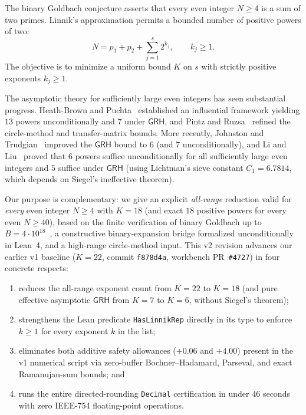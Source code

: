 \documentclass[11pt,a4paper]{article}
\newcommand{\GRH}{\mathsf{GRH}}
\begin{document}
The binary Goldbach conjecture asserts that every even integer $N \ge 4$ is a sum of two primes. Linnik's approximation permits a bounded number of positive powers of two:
\[
  N = p_1 + p_2 + \sum_{j=1}^{s} 2^{k_j}, \qquad k_j \ge 1.
\]
The objective is to minimize a uniform bound $K$ on $s$ with strictly positive exponents $k_j \ge 1$.

The asymptotic theory for sufficiently large even integers has seen substantial progress. Heath-Brown and Puchta~\cite{HBP2002} established an influential framework yielding $13$ powers unconditionally and $7$ under $\GRH$, and Pintz and Ruzsa~\cite{PR2003,PR2020} refined the circle-method and transfer-matrix bounds. More recently, Johnston and Trudgian~\cite{JT2026} improved the $\GRH$ bound to $6$ (and $7$ unconditionally), and Li and Liu~\cite{LL2026} proved that $6$ powers suffice unconditionally for all sufficiently large even integers and $5$ suffice under $\GRH$ (using Lichtman's sieve constant $C_1 = 6.7814$, which depends on Siegel's ineffective theorem).

Our purpose is complementary: we give an explicit \emph{all-range} reduction valid for \emph{every} even integer $N \ge 4$ with $K = 18$ (and exact $18$ positive powers for every even $N \ge 40$), based on the finite verification of binary Goldbach up to $B = 4\cdot 10^{18}$~\cite{OSHP2014}, a constructive binary-expansion bridge formalized unconditionally in Lean~4, and a high-range circle-method input. This v2 revision advances our earlier v1 baseline ($K = 22$, commit \texttt{f878d4a}, workbench PR~\texttt{\#4727}) in four concrete respects:
\begin{enumerate}[leftmargin=2em,itemsep=2pt]
  \item reduces the all-range exponent count from $K = 22$ to $K = 18$ (and pure effective asymptotic $\GRH$ from $K = 7$ to $K = 6$, without Siegel's theorem);
  \item strengthens the Lean predicate \texttt{HasLinnikRep} directly in its type to enforce $k \ge 1$ for every exponent $k$ in the list;
  \item eliminates both additive safety allowances ($+0.06$ and $+4.00$) present in the v1 numerical script via zero-buffer Bochner--Hadamard, Parseval, and exact Ramanujan-sum bounds; and
  \item runs the entire directed-rounding \texttt{Decimal} certification in under $46$ seconds with zero IEEE-754 floating-point operations.
\end{enumerate}
\end{document}
